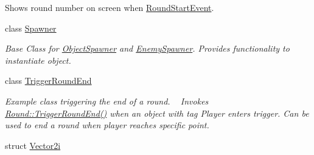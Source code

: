 \begin{DoxyCompactItemize}
\begin{DoxyCompactList}
Shows round number on screen when \hyperlink{class_round_manager_1_1_events_1_1_round_start_event}{Round\+Start\+Event}. \end{DoxyCompactList}\item 
class \hyperlink{class_round_manager_1_1_spawner}{Spawner}
\begin{DoxyCompactList}\small\item\em Base Class for \hyperlink{class_round_manager_1_1_object_spawner}{Object\+Spawner} and \hyperlink{class_round_manager_1_1_enemy_spawner}{Enemy\+Spawner}. Provides functionality to instantiate object. \end{DoxyCompactList}\item 
class \hyperlink{class_round_manager_1_1_trigger_round_end}{Trigger\+Round\+End}
\begin{DoxyCompactList}\small\item\em Example class triggering the end of a round. ~\newline
Invokes \hyperlink{class_round_manager_1_1_round_a920b20ddeb67d8ab4dc68ae956db459f}{Round\+::\+Trigger\+Round\+End()} when an object with tag \textquotesingle{}Player\textquotesingle{} enters trigger. Can be used to end a round when player reaches specific point. \end{DoxyCompactList}\item 
struct \hyperlink{struct_round_manager_1_1_vector2i}{Vector2i}
\end{DoxyCompactItemize}
